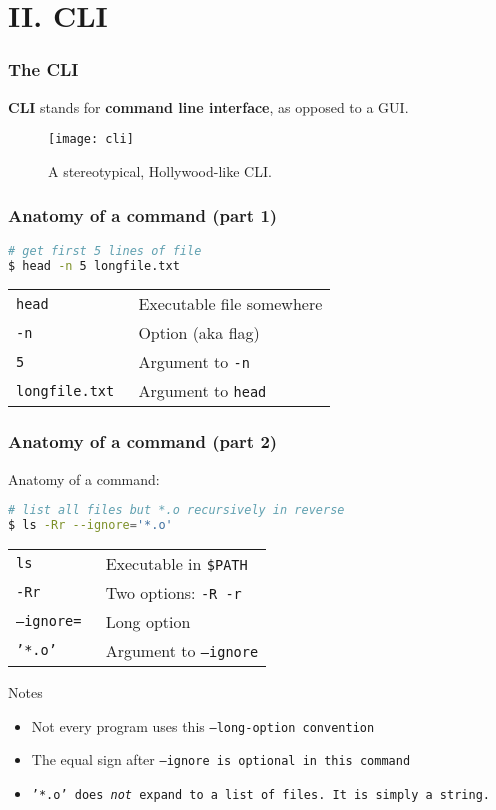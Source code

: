 \section{II. CLI}
\begin{frame}
\frametitle{The CLI}
\textbf{CLI} stands for \textbf{command line interface}, as opposed to a GUI.

\begin{figure}[h]
    \centering
    \texttt{[image: cli]}
    \caption{A stereotypical, Hollywood-like CLI.}
\end{figure}
\end{frame}

\begin{frame}[fragile]
\frametitle{Anatomy of a command (part 1)}
\begin{lstlisting}[language=bash]
# get first 5 lines of file
$ head -n 5 longfile.txt
\end{lstlisting}
\begin{tabular}{ll}
    \tt{head}            & Executable file somewhere \\
    \tt{-n}              & Option (aka flag) \\
    \tt{5}               & Argument to \tt{-n} \\
    \tt{longfile.txt}    & Argument to \tt{head}
\end{tabular}
\end{frame}

\begin{frame}[fragile]
\frametitle{Anatomy of a command (part 2)}
Anatomy of a command:
\begin{lstlisting}[language=bash]
# list all files but *.o recursively in reverse
$ ls -Rr --ignore='*.o'
\end{lstlisting}
\begin{tabular}{ll}
    \tt{ls}             & Executable in \tt{\$PATH} \\
    \tt{-Rr}            & Two options: \tt{-R -r} \\
    \tt{--ignore=}      & Long option \\
    \tt{'*.o'}          & Argument to \tt{--ignore}
\end{tabular}
\begin{block}{Notes}
    \begin{itemize}
        \item Not every program uses this \tt{--long-option} convention
        \item The equal sign after \tt{--ignore} is optional in this command
        \item \tt{'*.o'} does \textit{not} expand to a list of files.
            It is simply a string.
    \end{itemize}
\end{block}
\end{frame}

